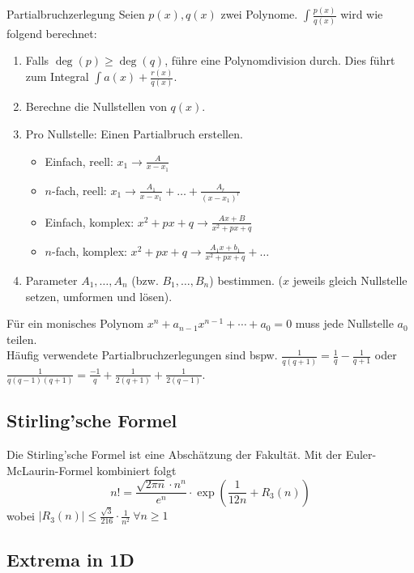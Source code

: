 \documentclass[a4paper,10pt]{article}
\begin{document}
 \begin{mainbox}{Partialbruchzerlegung}
  Seien $p(x), q(x)$ zwei Polynome. $\int \frac{p(x)}{q(x)}$ wird wie folgend berechnet:
  \begin{enumerate}
   \item Falls $\deg(p) \ge \deg(q)$, führe eine Polynomdivision durch. Dies führt zum Integral $\int a(x) + \frac{r(x)}{q(x)}$.
   \item Berechne die Nullstellen von $q(x)$.
   \item Pro Nullstelle: Einen Partialbruch erstellen.
   \begin{itemize}[left=0pt]
    \item Einfach, reell: $x_1 \to \frac{A}{x - x_1}$
    \item $n$-fach, reell: $x_1 \to \frac{A_1}{x - x_1} + \ldots + \frac{A_r}{(x-x_1)^r}$ 
    \item Einfach, komplex: $x^2 + px + q \to \frac{Ax + B} {x^2 + px + q}$
    \item $n$-fach, komplex: $x^2 + px + q \to \frac{A_1x+b_1}{x^2+px+q} + \ldots$
   \end{itemize}
   \item Parameter $A_1, \ldots, A_n$ (bzw. $B_1, \ldots, B_n$) bestimmen. ($x$ jeweils gleich Nullstelle setzen, umformen und lösen).
 
  \end{enumerate}
 \end{mainbox}

Für ein monisches Polynom $x^n + a_{n-1} x^{n-1} + \cdots + a_0 = 0$ muss jede Nullstelle $a_0$ teilen.\\

Häufig verwendete Partialbruchzerlegungen sind bspw. $\frac{1}{q(q+1)} = \frac{1}{q} - \frac{1}{q + 1}$ oder $\frac{1}{q(q-1)(q+1)} = \frac{-1}{q} + \frac{1}{2(q+1)} + \frac{1}{2(q-1)}$.

\subsection{Stirling'sche Formel}
Die Stirling'sche Formel ist eine Abschätzung der Fakultät. Mit der Euler-McLaurin-Formel kombiniert folgt
$$n! = \frac{\sqrt{2\pi n} \cdot n^n}{e^n} \cdot \exp(\frac{1}{12n}+R_3(n))$$
wobei $|R_3(n)| \le \frac{\sqrt{3}}{216}\cdot\frac{1}{n^2} \ \forall n \ge 1$

\subsection{Extrema in 1D}
\end{document}
